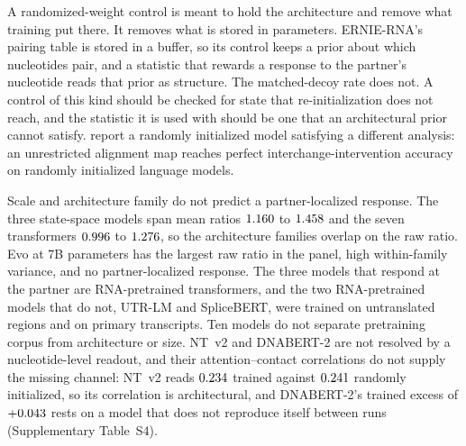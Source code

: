 \documentclass[11pt]{article}
\begin{document}
A randomized-weight control is meant to hold the architecture and remove what
training put there. It removes what is stored in parameters. ERNIE-RNA's
pairing table is stored in a buffer, so its control keeps a prior about which
nucleotides pair, and a statistic that rewards a response to the partner's
nucleotide reads that prior as structure. The matched-decoy rate does not. A
control of this kind should be checked for state that re-initialization does
not reach, and the statistic it is used with should be one that an
architectural prior cannot satisfy. \citet{sutter2025non} report a randomly
initialized model satisfying a different analysis: an unrestricted alignment
map reaches perfect interchange-intervention accuracy on randomly initialized
language models.

Scale and architecture family do not predict a partner-localized response. The
three state-space models span mean ratios $1.160{}$ to $1.458{}$
and the seven transformers $0.996{}$ to $1.276{}$, so the
architecture families overlap on the raw ratio. Evo at 7B
parameters has the largest raw ratio in the panel, high within-family variance,
and no partner-localized response. The three models that respond at the partner
are RNA-pretrained transformers, and the two RNA-pretrained models that do not,
UTR-LM and SpliceBERT, were trained on untranslated regions and on primary
transcripts. Ten models do not separate pretraining corpus from architecture or
size. NT~v2 and DNABERT-2 are not resolved by a nucleotide-level readout, and
their attention--contact correlations do not supply the missing channel: NT~v2
reads $0.234{}$ trained against $0.241{}$ randomly
initialized, so its correlation is architectural, and DNABERT-2's trained
excess of $+0.043{}$ rests on a model that does not reproduce
itself between runs (Supplementary Table~S4).

\end{document}
